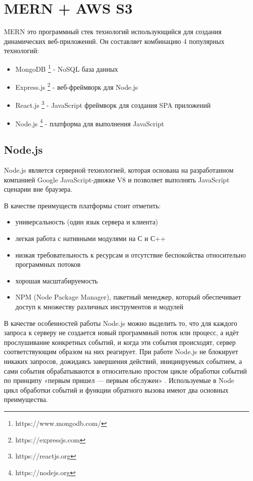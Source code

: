 \documentclass[%
  a5paper,
  subf,
  href,
  master,
  dotsinheaders 
]{csse-fcs}
\begin{document}
\section{MERN + AWS S3}

MERN \cite{mern} это программный стек технологий использующийся для создания динамических веб-приложений. Он составляет комбинацию 4 популярных технологий: 

\begin{itemize}
	\item MongoDB \footnote{https://www.mongodb.com/} - NoSQL база данных
	\item Express.js \footnote{https://expressjs.com} - веб-фреймворк для Node.js
	\item React.js \footnote{https://reactjs.org} - JavaScript фреймворк для создания SPA приложений
	\item Node.js \footnote{https://nodejs.org} - платформа для выполнения JavaScript
\end{itemize}

\subsection{Node.js}

Node.js является серверной технологией, которая основана на разработанном компанией Google JavaScript-движке V8 и позволяет выполнять JavaScript сценарии вне браузера.

В качестве преимуществ платформы стоит отметить:

\begin{itemize}
	\item универсальность (один язык сервера и клиента)
	\item легкая работа с нативными модулями на С и С++
	\item низкая требовательность к ресурсам и отсутствие беспокойства относительно программных потоков
	\item хорошая масштабируемость
	\item NPM (Node Package Manager), пакетный менеджер, который обеспечивает доступ к множеству различных инструментов и модулей
\end{itemize}

В качестве особенностей работы Node.js можно выделить то, что для каждого запроса к серверу не создается новый программный поток или процесс, а идёт прослушивание конкретных событий, и когда эти события происходят, сервер соответствующим образом на них реагирует. При работе Node.js не блокирует никаких запросов, дожидаясь завершения действий, инициируемых событием, а сами события обрабатываются в относительно простом цикле обработки событий по принципу «первым пришел — первым обслужен» \cite{node}. Используемые в Node цикл обработки событий и функции обратного вызова имеют два основных преимущества. 
\end{document}
